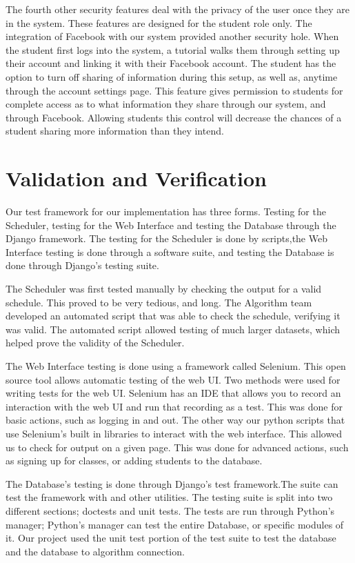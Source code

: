 \documentclass[12pt]{article}
\begin{document}
The fourth other security features deal with the privacy of the user once they are in the system. These features are designed for the student role only. The integration of Facebook with our system provided another security hole. When the student first logs into the system, a tutorial walks them through setting up their account and linking it with their Facebook account. The student has the option to turn off sharing of information during this setup, as well as, anytime through the account settings page. This feature gives permission to students for complete access as to what information they share through our system, and through Facebook. Allowing students this control will decrease the chances of a student sharing more information than they intend. %

\section{Validation and Verification} %
Our test framework for our implementation has three forms. Testing for the Scheduler, testing for the Web Interface and testing the Database through the Django framework. The testing for the Scheduler is done by scripts,the Web Interface testing is done through a software suite, and testing the Database is done through Django's testing suite.

The Scheduler was first tested manually by checking the output for a valid schedule. This proved to be very tedious, and long. The Algorithm team developed an automated script that was able to check the schedule, verifying it was valid. The automated script allowed testing of much larger datasets, which helped prove the validity of the Scheduler.

The Web Interface testing is done using a framework called Selenium. This open source tool allows automatic testing of the web UI. Two methods were used for writing tests for the web UI. Selenium has an IDE that allows you to record an interaction with the web UI and run that recording as a test. This was done for basic actions, such as logging in and out. The other way our python scripts that use Selenium's built in libraries to interact with the web interface. This allowed us to check for output on a given page. This was done for advanced actions, such as signing up for classes, or adding students to the database.

The Database's testing is done through  Django's test framework.The suite can test the framework with and other utilities. The testing suite is split into two different sections; doctests and unit tests. The tests are run through Python's manager; Python's manager can test the entire Database, or specific modules of it. Our project used the unit test portion of the test suite to test the database and the database to algorithm connection.
\end{document}
